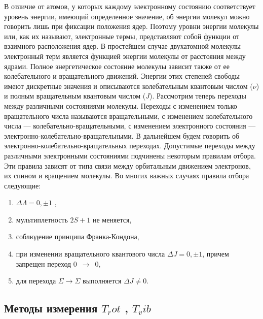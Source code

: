 \documentclass[a4paper,12pt]{article}
\begin{document}
	В отличие от атомов, у которых каждому электронному состоянию соответствует
уровень энергии, имеющий определенное значение, об энергии молекул можно говорить лишь при фиксации положения ядер. Поэтому уровни энергии молекулы или, как их называют, электронные термы, представляют собой функции от взаимного расположения
ядер. В простейшем случае двухатомной молекулы электронный терм является функцией
энергии молекулы от расстояния между ядрами. Полное энергетическое состояние молекулы зависит также от ее колебательного и
вращательного движений. Энергии этих степеней свободы имеют дискретные значения и
описываются колебательным квантовым числом ($\nu$) и полным вращательным квантовым
числом ($J$). Рассмотрим теперь переходы между различными состояниями молекулы.
Переходы с изменением только вращательного числа называются вращательными, с
изменением колебательного числа — колебательно-вращательными, с изменением
электронного состояния — электронно-колебательно-вращательными. В дальнейшем будем
говорить об электронно-колебательно-вращательных переходах. Допустимые переходы между различными электронными состояниями подчинены некоторым правилам отбора.
Эти правила зависят от типа связи между орбитальным движением электронов, их спином
и вращением молекулы. Во многих важных случаях правила отбора следующие:
	
\begin{enumerate}
	
	\item $\Delta \Lambda = 0, \pm 1 $ , 
	\item мультиплетность $2S+1$ не меняется,
	\item соблюдение принципа Франка-Кондона,
	\item при изменении вращательного квантового числа $\Delta J = 0, \pm 1 $, причем запрещен переход 0~$\rightarrow $~0,
	\item для перехода $ \Sigma \rightarrow \Sigma $ выполняется $ \Delta J \neq 0$.	
\end{enumerate}

	
	\subsection{ Методы измерения $T_rot$ , $T_vib$}
	 
\end{document}
